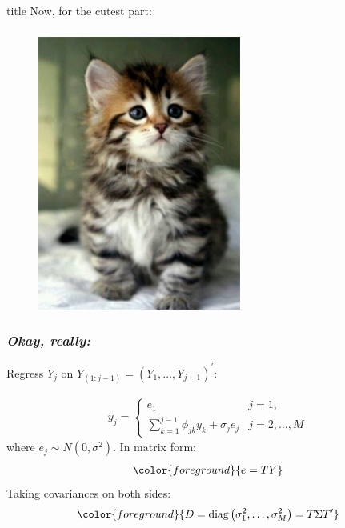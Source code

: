 \documentclass[12pt]{beamer}
\newcommand{\newmaththought}[1]{{ \color{foreground} {#1}}}
\newcommand{\ms}{\scriptscriptstyle}
\begin{document}
\begin{frame}
\frametitle{}

\vfill
  \begin{beamercolorbox}[center]{title}
\Large Now, for the cutest part:
  \end{beamercolorbox}
  \vfill

\end{frame}




\begin{frame}
\frametitle{}
\begin{figure}
\graphicspath{{img/}}
  \includegraphics[height=9cm]{cutest-kitten-ever}
\end{figure}

\end{frame}

\begin{frame}
\frametitle{\emph{Okay, really:}}

Regress $Y_j$ on $Y_{\ms{\left(1:j-1\right)}} = \left(Y_1, \dots, Y_{\ms{j-1}}\right)^\prime$:

\begin{align*} \label{eq:ARmodel}
y_{j}  = \left\{  \begin{array}{ll} 
		e_1 &j=1, \\
  \sum \limits_{k=1}^{j-1} \phi_{jk} y_{k} + \sigma_{j}e_{j} &  j=2,\dots,M
\end{array}\right.
\end{align*}
\noindent
where $e_j \sim N\left( 0,\sigma^2 \right)$. In matrix form:
\begin{align*}
\newmaththought{ e = TY}
\end{align*}
\noindent
Taking covariances on both sides:
\begin{equation*}
\newmaththought{ D =  \mbox{diag}\left( \sigma_1^2,\dots, \sigma_M^2 \right) = T \Sigma T^\prime}
\end{equation*}
\end{frame}
\end{document}
